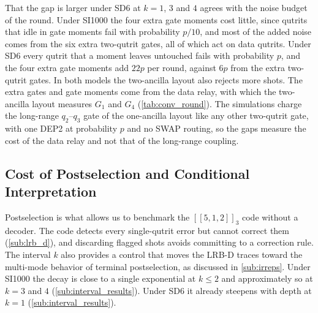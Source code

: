 That the gap is larger under SD6 at $k = 1$, $3$ and $4$ agrees with the noise budget of the round. Under SI1000 the four extra gate moments cost little, since qutrits that idle in gate moments fail with probability $p/10$, and most of the added noise comes from the six extra two-qutrit gates, all of which act on data qutrits. Under SD6 every qutrit that a moment leaves untouched fails with probability $p$, and the four extra gate moments add $22p$ per round, against $6p$ from the extra two-qutrit gates. In both models the two-ancilla layout also rejects more shots. The extra gates and gate moments come from the data relay, with which the two-ancilla layout measures $G_1$ and $G_4$ (\autoref{tab:conv_round}). The simulations charge the long-range $q_2$--$q_3$ gate of the one-ancilla layout like any other two-qutrit gate, with one DEP2 at probability $p$ and no SWAP routing, so the gaps measure the cost of the data relay and not that of the long-range coupling.

\subsection{Cost of Postselection and Conditional Interpretation}
\label{sub:postselection_cost}

Postselection is what allows us to benchmark the $[[5,1,2]]_3$ code without a decoder. The code detects every single-qutrit error but cannot correct them (\autoref{sub:lrb_d}), and discarding flagged shots avoids committing to a correction rule. The interval $k$ also provides a control that moves the LRB-D traces toward the multi-mode behavior of terminal postselection, as discussed in \autoref{sub:irreps}. Under SI1000 the decay is close to a single exponential at $k \le 2$ and approximately so at $k = 3$ and $4$ (\autoref{sub:interval_results}). Under SD6 it already steepens with depth at $k = 1$ (\autoref{sub:interval_results}).

